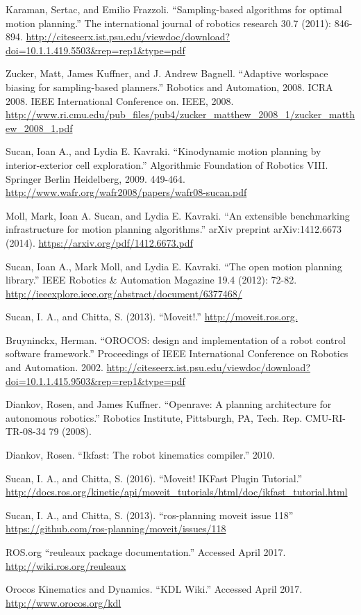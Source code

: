 \documentclass[12pt]{report}
\begin{document}
\begin{thebibliography}{99}
 Karaman, Sertac, and Emilio Frazzoli. ``Sampling-based algorithms for optimal motion planning.'' The international journal of robotics research 30.7 (2011): 846-894. \url{http://citeseerx.ist.psu.edu/viewdoc/download?doi=10.1.1.419.5503&rep=rep1&type=pdf}

 Zucker, Matt, James Kuffner, and J. Andrew Bagnell. ``Adaptive workspace biasing for sampling-based planners.'' Robotics and Automation, 2008. ICRA 2008. IEEE International Conference on. IEEE, 2008. \url{http://www.ri.cmu.edu/pub_files/pub4/zucker_matthew_2008_1/zucker_matthew_2008_1.pdf}

 Sucan, Ioan A., and Lydia E. Kavraki. ``Kinodynamic motion planning by interior-exterior cell exploration.'' Algorithmic Foundation of Robotics VIII. Springer Berlin Heidelberg, 2009. 449-464. \url{http://www.wafr.org/wafr2008/papers/wafr08-sucan.pdf}

 Moll, Mark, Ioan A. Sucan, and Lydia E. Kavraki. ``An extensible benchmarking infrastructure for motion planning algorithms.'' arXiv preprint arXiv:1412.6673 (2014). \url{https://arxiv.org/pdf/1412.6673.pdf}

 Sucan, Ioan A., Mark Moll, and Lydia E. Kavraki. ``The open motion planning library.'' IEEE Robotics \& Automation Magazine 19.4 (2012): 72-82. \url{http://ieeexplore.ieee.org/abstract/document/6377468/}

 Sucan, I. A., and Chitta, S. (2013). ``Moveit!.'' \url{http://moveit.ros.org.}

 Bruyninckx, Herman. ``OROCOS: design and implementation of a robot control software framework.'' Proceedings of IEEE International Conference on Robotics and Automation. 2002. \url{http://citeseerx.ist.psu.edu/viewdoc/download?doi=10.1.1.415.9503&rep=rep1&type=pdf}

 Diankov, Rosen, and James Kuffner. ``Openrave: A planning architecture for autonomous robotics.'' Robotics Institute, Pittsburgh, PA, Tech. Rep. CMU-RI-TR-08-34 79 (2008).

 Diankov, Rosen. ``Ikfast: The robot kinematics compiler.'' 2010.

 Sucan, I. A., and Chitta, S. (2016). ``Moveit! IKFast Plugin Tutorial.'' \url{http://docs.ros.org/kinetic/api/moveit_tutorials/html/doc/ikfast_tutorial.html}

 Sucan, I. A., and Chitta, S. (2013). ``ros-planning moveit issue 118'' \url{https://github.com/ros-planning/moveit/issues/118}

 ROS.org ``reuleaux package documentation.'' Accessed April 2017. \url{http://wiki.ros.org/reuleaux}

 Orocos Kinematics and Dynamics. ``KDL Wiki.'' Accessed April 2017. \url{http://www.orocos.org/kdl}

\end{thebibliography}
\end{document}
